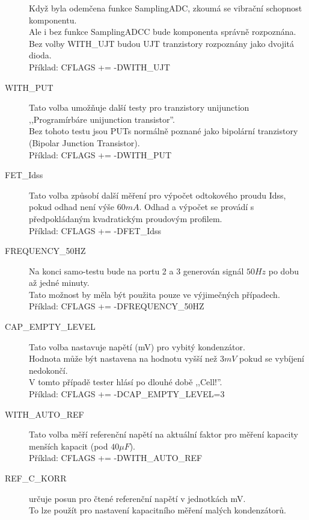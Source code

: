 \begin{description}
Když byla odemčena funkce SamplingADC, zkoumá se vibrační schopnost komponentu.\\
Ale i bez funkce SamplingADCC bude komponenta správně rozpoznána.\\
Bez volby WITH\_UJT budou UJT tranzistory rozpoznány jako dvojitá dioda.\\
Příklad: CFLAGS += -DWITH\_UJT
\vspace{-0,3cm}
  \item[WITH\_PUT]
Tato volba umožňuje další testy pro tranzistory unijunction ,,Programírbáre unijunction transistor''.\\
Bez tohoto testu jsou PUTs normálně poznané jako bipolární tranzistory (Bipolar Junction Transistor).\\
Příklad: CFLAGS += -DWITH\_PUT
\vspace{-0,3cm}
 \item[FET\_Idss]
Tato volba způsobí další měření pro výpočet odtokového proudu Idss, pokud odhad není
výše \(60mA\). Odhad a výpočet se provádí s předpokládaným kvadratickým proudovým profilem.\\
Příklad: CFLAGS += -DFET\_Idss
\vspace{-0,3cm}
  \item[FREQUENCY\_50HZ] Na konci samo-testu bude na portu 2 a 3 generován signál \(50Hz\) po dobu až jedné minuty.\\
Tato možnost by měla být použita pouze ve výjimečných případech.\\
Příklad: CFLAGS += -DFREQUENCY\_50HZ
\vspace{-0,3cm}
  \item[CAP\_EMPTY\_LEVEL] Tato volba nastavuje napětí (mV) pro vybitý kondenzátor.\\
Hodnota může být nastavena na hodnotu vyšší než \(3mV\) pokud se vybíjení nedokončí.\\ V tomto případě tester hlásí po dlouhé době ,,Cell!''.\\
Příklad: CFLAGS += -DCAP\_EMPTY\_LEVEL=3
\vspace{-0,3cm}
  \item[WITH\_AUTO\_REF] Tato volba měří referenční napětí na aktuální faktor pro měření kapacity
menších kapacit (pod \(40\mu F\)).\\
Příklad: CFLAGS += -DWITH\_AUTO\_REF
\vspace{-0,3cm}
  \item[REF\_C\_KORR] určuje posun pro čtené referenční napětí v jednotkách mV.\\
To lze použít pro nastavení kapacitního měření malých kondenzátorů.\\

\end{description}
